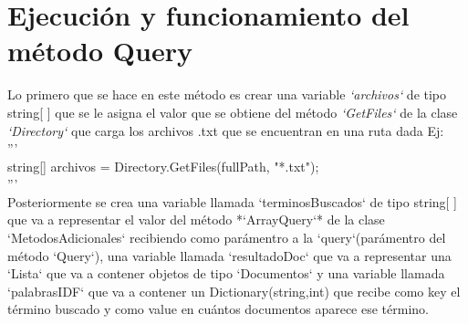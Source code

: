 \documentclass{article}
\begin{document}
\section{Ejecución y funcionamiento del método Query}
Lo primero que se hace en este método es crear una variable \textit{`archivos`} de tipo string[ ] 
que se le asigna el valor que se obtiene del método \textit{`GetFiles`} de 
la clase \textit{`Directory`} que carga los archivos .txt que se encuentran en una ruta dada Ej:\\
'''\\
string[] archivos = Directory.GetFiles(fullPath, "*.txt");\\
'''\\
Posteriormente se crea una variable llamada `terminosBuscados` de tipo string[ ] que va a representar el 
valor del método *`ArrayQuery`* de la clase `MetodosAdicionales` recibiendo como parámentro a la `query`(parámentro del método `Query`), 
una variable llamada `resultadoDoc` que va a representar una `Lista` que va a contener objetos de tipo `Documentos` y una variable llamada `palabrasIDF`
 que va a contener un Dictionary(string,int) que recibe como key el término buscado y como value en cuántos documentos aparece ese término.\\
\end{document}
